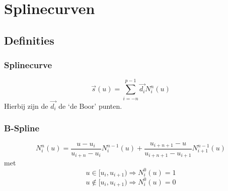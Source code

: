 \documentclass[notities.tex]{subfiles}
\begin{document}
\chapter{Splinecurven}
\section{Definities}
\subsection{Splinecurve}
\[
\vec{s}(u) = \sum_{i=-n}^{p-1}\vec{d_i}N_{i}^{n}(u)
\]
Hierbij zijn de $\vec{d_i}$ de `de Boor' punten.

\subsection{B-Spline}
\[
N_{i}^{n}(u)
= \frac{u-u_i}{u_{i+n}-u_i}					N_{i}^{n-1}(u)
+ \frac{u_{i+n+1}-u}{u_{i+n+1}-u_{i+1}}		N_{i+1}^{n-1}(u)
\]
met
\[
u \in [u_i,u_{i+1}) \Rightarrow N_{i}^{0}(u) = 1
\]
\[
u \not\in [u_i,u_{i+1}) \Rightarrow N_{i}^{0}(u) = 0
\]
\end{document}
